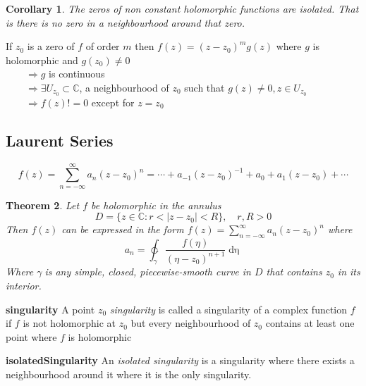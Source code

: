 \documentclass{article}
\newtheorem{theorem}{Theorem}[section]
\newtheorem{corollary}[theorem]{Corollary}
\newenvironment{proof}[1][Proof]{\begin{trivlist}
\item[\hskip \labelsep {\bfseries #1}]}{\end{trivlist}}
\newenvironment{definition}[1][Definition]{\begin{trivlist}
\item[\hskip \labelsep {\bfseries #1}]}{\end{trivlist}}
\newcommand{\C}{\mathbb{C}}
\newcommand{\GG}{$ \gamma \;$}
\newcommand{\SumII}{\sum_{n = -\infty}^\infty}
\newcommand{\LSeries}{\SumII a_n(z-z_0)^n}
\begin{document}
\begin{corollary}
    The zeros of non constant holomorphic functions are isolated. That is there is no zero in a neighbourhood around that zero.
\end{corollary}
\begin{proof}
    If $z_0$ is a zero of $f$ of order $m$ then $f(z)=(z-z_0)^m g(z)$ where $g$ is holomorphic and $g(z_0) \neq 0$\\
    $\qquad \Rightarrow g$ is continuous\\
    $\qquad \Rightarrow \exists U_{z_0} \subset \C$, a neighbourhood of $z_0$ such that $g(z) \neq 0, z \in U_{z_0}$\\
    $\qquad \Rightarrow f(z) != 0$ except for $z = z_0$
\end{proof}

\subsection*{Laurent Series}

\begin{definition}
    \[f(z) = \LSeries = \cdots + a_{-1}(z-z_0)^{-1} + a_0 + a_1(z-z_0) + \cdots \]
\end{definition}

\begin{theorem}
    Let $f$ be holomorphic in the annulus
    \[D = \{z \in \C: r < |z-z_0| < R\},\quad r,R > 0\]
    Then $f(z)$ can be expressed in the form $f(z) = \LSeries$ where
    \[a_n = \ointctrclockwise_\gamma \frac{f(\eta)}{(\eta - z_0)^{n+1}} \mathop{d\eta}\]
    Where \GG is any simple, closed, piecewise-smooth curve in $D$ that contains $z_0$ in its interior.
\end{theorem}

\begin{definition} \label{singularity} \textbf{singularity}
    A point $z_0$ \textit{singularity} is called a singularity of a complex function $f$ if
    $f$ is not holomorphic at $z_0$ but every neighbourhood of $z_0$ contains at least one point where $f$ is holomorphic
\end{definition}

\begin{definition} \label{isolatedSingularity} \textbf{isolatedSingularity}
    An \textit{isolated singularity} is a singularity where there exists a neighbourhood around it where it is the only singularity.
\end{definition}
\end{document}
